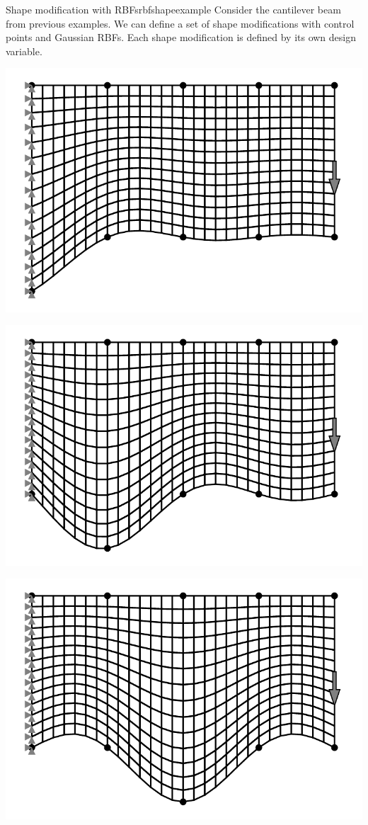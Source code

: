 \begin{example}{Shape modification with RBFs}{rbfshapeexample}   
    Consider the cantilever beam from previous examples. We can define a set of shape modifications with control points and Gaussian RBFs. Each shape modification is defined by its own design variable. 
    
    \begin{minipage}{.5\textwidth}
        \centering
        \includegraphics[width=0.9\linewidth]{figures/cantilever_fem_shape_0.pdf}
    \end{minipage}%
    \begin{minipage}{.5\textwidth}
        \centering
        \includegraphics[width=0.9\linewidth]{figures/cantilever_fem_shape_1.pdf}
    \end{minipage}
    \begin{minipage}{.5\textwidth}
        \centering
        \includegraphics[width=0.9\linewidth]{figures/cantilever_fem_shape_2.pdf}

\end{minipage}
\end{example}

